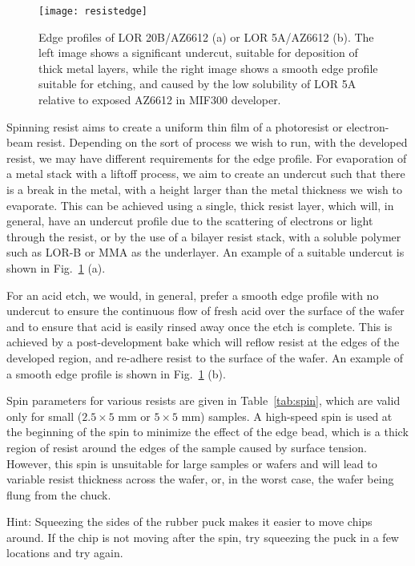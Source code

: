 \begin{figure}
    \texttt{[image: resistedge]}
    \caption[Edge profiles of two resists]
    {\label{fig:resistedge}Edge profiles of LOR 20B/AZ6612 (a) or LOR 5A/AZ6612 (b). The left image shows a significant undercut,
    suitable for deposition of thick metal layers, while the right image shows a smooth edge profile suitable for etching, and caused
    by the low solubility of LOR 5A relative to exposed AZ6612 in MIF300 developer. }
\end{figure}

Spinning resist aims to create a uniform thin film of a photoresist or electron-beam resist. Depending on the sort of process we wish
to run, with the developed resist, we may have different requirements for the edge profile. For evaporation of a metal stack with a
liftoff process, we aim to create an undercut such that there is a break in the metal, with a height larger than the metal thickness we wish to evaporate. This can
be achieved using a single, thick resist layer, which will, in general, have an undercut profile due to the scattering of electrons or light through the resist, or by
the use of a bilayer resist stack, with a soluble polymer such as LOR-B or MMA as the underlayer. An example of a suitable undercut is shown in Fig.~\ref{fig:resistedge} (a).

For an acid etch, we would, in general, prefer a smooth edge profile with no undercut to ensure the continuous flow of fresh acid over the
surface of the wafer and to ensure that acid is easily rinsed away once the etch is complete. This is achieved by a post-development bake which will reflow resist at the edges of the developed region, and re-adhere resist to the surface of the wafer. An example of a
smooth edge profile is shown in Fig.~\ref{fig:resistedge} (b).

Spin parameters for various resists are given in Table~\ref{tab:spin}, which are valid only for small ($2.5 \times 5$ \si{\milli\meter} or $5 \times 5$ \si{\milli\meter}) samples. A high-speed spin is used at the beginning of the spin to minimize the effect of the edge bead, which is a thick region of resist around the edges of the sample caused by surface tension. However, this spin is unsuitable for large samples or wafers and will lead to variable resist thickness across the wafer, or, in the worst case, the wafer being flung from the chuck.

Hint: Squeezing the sides of the rubber puck makes it easier to move chips around. If the chip is not moving after the spin, try squeezing the
puck in a few locations and try again.


